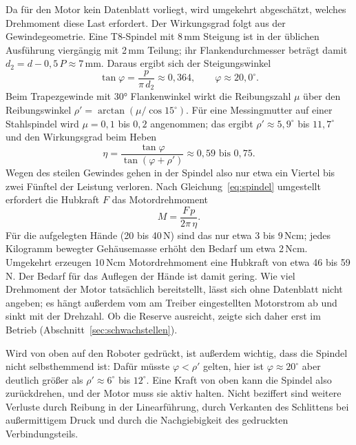 Da für den Motor kein Datenblatt vorliegt, wird umgekehrt abgeschätzt, welches Drehmoment diese
Last erfordert. Der Wirkungsgrad folgt aus der Gewindegeometrie. Eine T8-Spindel mit 8\,mm
Steigung ist in der üblichen Ausführung viergängig mit 2\,mm Teilung; ihr Flankendurchmesser
beträgt damit $d_2 = d - 0{,}5\,P \approx 7$\,mm. Daraus ergibt sich der Steigungswinkel
\begin{equation}
  \tan\varphi = \frac{p}{\pi\,d_2} \approx 0{,}364, \qquad \varphi \approx 20{,}0^\circ .
  \label{eq:steigungswinkel}
\end{equation}
Beim Trapezgewinde mit 30° Flankenwinkel wirkt die Reibungszahl $\mu$ über den Reibungswinkel
$\rho' = \arctan\left(\mu / \cos 15^\circ\right)$. Für eine Messingmutter auf einer Stahlspindel
wird $\mu = 0{,}1$ bis $0{,}2$ angenommen; das ergibt $\rho' \approx 5{,}9^\circ$ bis $11{,}7^\circ$
und den Wirkungsgrad beim Heben
\begin{equation}
  \eta = \frac{\tan\varphi}{\tan(\varphi + \rho')} \approx 0{,}59 \text{ bis } 0{,}75 .
  \label{eq:wirkungsgrad}
\end{equation}
Wegen des steilen Gewindes gehen in der Spindel also nur etwa ein Viertel bis zwei Fünftel der
Leistung verloren. Nach Gleichung~\ref{eq:spindel} umgestellt erfordert die Hubkraft $F$ das
Motordrehmoment
\begin{equation}
  M = \frac{F\,p}{2\pi\,\eta} .
  \label{eq:moment}
\end{equation}
Für die aufgelegten Hände (20 bis 40\,N) sind das nur etwa 3 bis 9\,Ncm; jedes Kilogramm bewegter
Gehäusemasse erhöht den Bedarf um etwa 2\,Ncm. Umgekehrt erzeugen 10\,Ncm Motordrehmoment eine
Hubkraft von etwa 46 bis 59\,N. Der Bedarf für das Auflegen der Hände ist damit gering. Wie
viel Drehmoment der Motor tatsächlich bereitstellt, lässt sich ohne Datenblatt nicht angeben;
es hängt außerdem vom am Treiber eingestellten Motorstrom ab und sinkt mit der Drehzahl. Ob die
Reserve ausreicht, zeigte sich daher erst im Betrieb (Abschnitt~\ref{sec:schwachstellen}).

Wird von oben auf den Roboter gedrückt, ist außerdem wichtig, dass die Spindel nicht selbsthemmend ist:
Dafür müsste $\varphi < \rho'$ gelten, hier ist $\varphi \approx 20^\circ$ aber deutlich größer als
$\rho' \approx 6^\circ$ bis $12^\circ$. Eine Kraft von oben kann die Spindel also zurückdrehen, und
der Motor muss sie aktiv halten. Nicht beziffert sind weitere Verluste durch Reibung in der Linearführung, durch Verkanten des
Schlittens bei außermittigem Druck und durch die Nachgiebigkeit des gedruckten Verbindungsteils.

